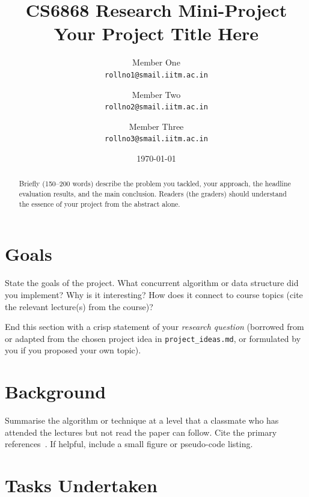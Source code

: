 \documentclass[11pt,a4paper]{article}
\title{%
  \textbf{CS6868 Research Mini-Project} \\[0.3em]
  \Large Your Project Title Here%
}
\author{%
  Member One \\ \texttt{rollno1@smail.iitm.ac.in}
  \and
  Member Two \\ \texttt{rollno2@smail.iitm.ac.in}
  \and
  Member Three \\ \texttt{rollno3@smail.iitm.ac.in}
}
\date{\today}
\begin{document}
\maketitle

\begin{abstract}
Briefly (150--200 words) describe the problem you tackled, your approach, the
headline evaluation results, and the main conclusion. Readers (the graders)
should understand the essence of your project from the abstract alone.
\end{abstract}

\section{Goals}
\label{sec:goals}

State the goals of the project. What concurrent algorithm or data structure
did you implement? Why is it interesting? How does it connect to course
topics (cite the relevant lecture(s) from the course)?

End this section with a crisp statement of your \emph{research question}
(borrowed from or adapted from the chosen project idea in
\texttt{project\_ideas.md}, or formulated by you if you proposed your own
topic).

\section{Background}
\label{sec:background}

Summarise the algorithm or technique at a level that a classmate who has
attended the lectures but not read the paper can follow. Cite the primary
references~\cite{example}. If helpful, include a small figure or
pseudo-code listing.


\section{Tasks Undertaken}
\label{sec:tasks}
\end{document}

